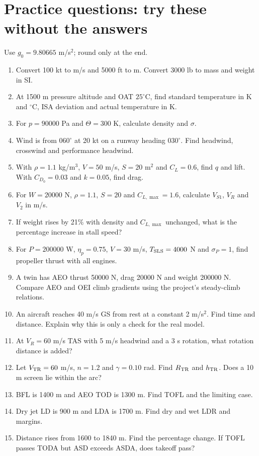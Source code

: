\documentclass[11pt,letterpaper]{article}
\newcommand{\topic}[1]{\clearpage\section{#1}}
\begin{document}
\topic{Practice questions: try these without the answers}
Use $g_0=9.80665$ m/s$^2$; round only at the end.
\begin{enumerate}[label=\textbf{\arabic*.}]
\item Convert 100 kt to m/s and 5000 ft to m. Convert 3000 lb to mass and weight in SI.
\item At 1500 m pressure altitude and OAT $25^\circ$C, find standard temperature
in K and $^\circ$C, ISA deviation and actual temperature in K.
\item For $p=90000$ Pa and $\Theta=300$ K, calculate density and $\sigma$.
\item Wind is from $060^\circ$ at 20 kt on a runway heading $030^\circ$.
Find headwind, crosswind and performance headwind.
\item With $\rho=1.1$ kg/m$^3$, $V=50$ m/s, $S=20$ m$^2$ and $C_L=0.6$,
find $q$ and lift. With $C_{D_0}=0.03$ and $k=0.05$, find drag.
\item For $W=20000$ N, $\rho=1.1$, $S=20$ and $C_{L,\max}=1.6$,
calculate $V_{S1}$, $V_R$ and $V_2$ in m/s.
\item If weight rises by 21\% with density and $C_{L,\max}$ unchanged,
what is the percentage increase in stall speed?
\item For $P=200000$ W, $\eta_p=0.75$, $V=30$ m/s,
$T_{\rm SLS}=4000$ N and $\sigma_P=1$, find propeller thrust with all engines.
\item A twin has AEO thrust 50000 N, drag 20000 N and weight 200000 N.
Compare AEO and OEI climb gradients using the project's steady-climb relations.
\item An aircraft reaches 40 m/s GS from rest at a constant 2 m/s$^2$.
Find time and distance. Explain why this is only a check for the real model.
\item At $V_R=60$ m/s TAS with 5 m/s headwind and a 3 s rotation,
what rotation distance is added?
\item Let $V_{\rm TR}=60$ m/s, $n=1.2$ and $\gamma=0.10$ rad.
Find $R_{\rm TR}$ and $h_{\rm TR}$. Does a 10 m screen lie within the arc?
\item BFL is 1400 m and AEO TOD is 1300 m. Find TOFL and the limiting case.
\item Dry jet LD is 900 m and LDA is 1700 m. Find dry and wet LDR and margins.
\item Distance rises from 1600 to 1840 m. Find the percentage change.
If TOFL passes TODA but ASD exceeds ASDA, does takeoff pass?
\end{enumerate}
\end{document}
